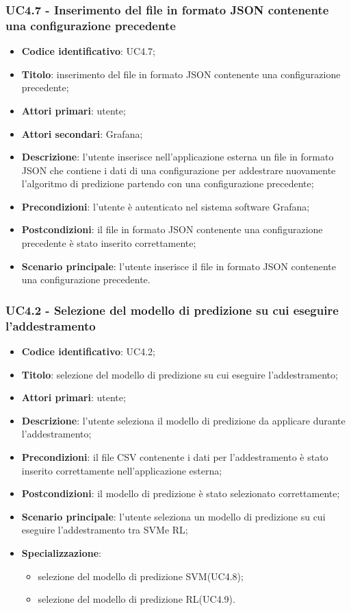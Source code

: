 \subsubsection{UC4.7 - Inserimento del file in formato JSON contenente una configurazione precedente}
\begin{itemize}
	\item \textbf{Codice identificativo}: UC4.7;
	\item \textbf{Titolo}: inserimento del file in formato JSON contenente una configurazione precedente;
	\item \textbf{Attori primari}: utente;
	\item \textbf{Attori secondari}: Grafana\glo;
	\item \textbf{Descrizione}: l'utente inserisce nell'applicazione esterna un file in formato JSON che contiene i dati di una configurazione per addestrare nuovamente l'algoritmo di predizione partendo con una configurazione precedente;
	\item \textbf{Precondizioni}: l'utente è autenticato nel sistema software Grafana\glo;
	\item \textbf{Postcondizioni}: il file in formato JSON contenente una configurazione precedente è stato inserito correttamente;
	\item \textbf{Scenario principale}: l'utente inserisce il file in formato JSON contenente una configurazione precedente.
\end{itemize}
\subsubsection{UC4.2 - Selezione del modello di predizione su cui eseguire l'addestramento}
\begin{itemize}
    \item \textbf{Codice identificativo}: UC4.2;
    \item \textbf{Titolo}: selezione del modello di predizione su cui eseguire l'addestramento;
    \item \textbf{Attori primari}: utente;
    \item \textbf{Descrizione}: l'utente seleziona il modello di predizione da applicare durante l'addestramento;
    \item \textbf{Precondizioni}: il file CSV contenente i dati per l'addestramento è stato inserito correttamente nell'applicazione esterna;
    \item \textbf{Postcondizioni}: il modello di predizione è stato selezionato correttamente;
    \item \textbf{Scenario principale}: l'utente seleziona un modello di predizione su cui eseguire l'addestramento tra SVM\glosp e RL\glo;
    \item \textbf{Specializzazione}:
    \begin{itemize}
    	\item selezione del modello di predizione SVM\glosp (UC4.8);
    	\item selezione del modello di predizione RL\glosp (UC4.9).
    \end{itemize}   
\end{itemize}
